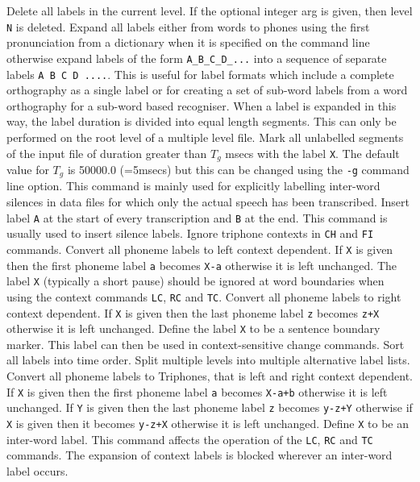 \begin{varlist}
    Delete all labels in the current level.  If the
     optional integer arg is given, then level \texttt{N} is deleted.
    Expand all labels either from words to phones using the 
        first pronunciation from a dictionary when it is specified on the 
        command line otherwise expand labels of the form 
        \texttt{A\_B\_C\_D\_...} into a sequence of separate labels 
        \texttt{A B C D ....}.  This is useful for label formats which 
        include a complete orthography as a single label or for creating 
        a set of sub-word labels from a word orthography for a sub-word 
        based recogniser.  When a label is expanded in this way, the 
        label duration is divided into equal length segments.  This can
        only be performed on the root level of a multiple level file.
    Mark all unlabelled segments of the input
       file of duration greater than $T_g$ msecs with the label \texttt{X}.
       The default value for $T_g$ is 50000.0 (=5msecs) but this
       can be changed using the \texttt{-g} command line option.  This
       command
       is mainly used for explicitly labelling inter-word silences in
       data files for which only the actual speech has been transcribed.
     Insert label \texttt{A} at the start of every
       transcription and \texttt{B} at the end.  This command is usually
       used to insert silence labels.
    Ignore triphone contexts in \texttt{CH} and \texttt{FI}
       commands.
    Convert all phoneme labels to left context
       dependent.  If \texttt{X} is given then the first phoneme label
       \texttt{a} becomes \texttt{X-a} otherwise it is left unchanged.
    The label  \texttt{X} (typically a short pause)
       should be ignored at word boundaries when using the context
       commands \texttt{LC}, \texttt{RC} and \texttt{TC}.
    Convert all phoneme labels to right context
       dependent.  If \texttt{X} is given then the last phoneme label
       \texttt{z} becomes \texttt{z+X} otherwise it is left unchanged.
     Define the label \texttt{X} to be a sentence boundary
       marker.  This label can then be used in context-sensitive change
       commands.
        Sort all labels into time order.
        Split multiple levels into multiple alternative label lists.
    Convert all phoneme labels to Triphones, that is
       left and right context
       dependent.  If \texttt{X} is given then the first phoneme label
       \texttt{a} becomes \texttt{X-a+b} otherwise it is left unchanged.
       If \texttt{Y} is given then the last phoneme label
       \texttt{z} becomes \texttt{y-z+Y} otherwise  if \texttt{X} is given then it
        becomes \texttt{y-z+X} otherwise it is left unchanged.
     Define \texttt{X} to be an inter-word label. 
       This command affects the operation of the \texttt{LC}, \texttt{RC}
       and \texttt{TC} commands.  The expansion of context labels is 
       blocked wherever an inter-word label occurs.
\end{varlist}

